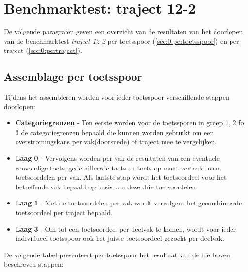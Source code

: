 \section{Benchmarktest: traject 12-2}
	\label{ch:benchmarktTest0}
De volgende paragrafen geven een overzicht van de resultaten van het doorlopen van de benchmarktest \textit{traject 12-2} per toetsspoor (\autoref{sec:0:pertoetsspoor}) en per traject (\autoref{sec:0:pertraject}).

\subsection{Assemblage per toetsspoor}
	\label{sec:0:pertoetsspoor}
Tijdens het assembleren worden voor ieder toetsspoor verschillende stappen doorlopen:
\begin{itemize}
	\item \textbf{Categoriegrenzen} - Ten eerste worden voor de toetssporen in groep 1, 2 fo 3 de categoriegrenzen bepaald die kunnen worden gebruikt om een overstromingskans per vak(door\-snede) of traject mee te vergelijken.
	\item \textbf{Laag 0} - Vervolgens worden per vak de resultaten van een eventuele eenvoudige toets, gedetailleerde toets en toets op maat vertaald naar toets\-oordelen per vak. Als laatste stap wordt het toetsoordeel voor het betreffende vak bepaald op basis van deze drie toetsoordelen.
	\item \textbf{Laag 1} - Met de toetsoordelen per vak wordt vervolgens het gecombineerde toetsoordeel per traject bepaald.
	\item \textbf{Laag 3} - Om tot een toetsoordeel per deelvak te komen, wordt voor ieder individueel toetsspoor ook het juiste toetsoordeel gezocht per deelvak.
\end{itemize}

De volgende tabel presenteert per toetsspoor het resultaat van de hierboven beschreven stappen:

